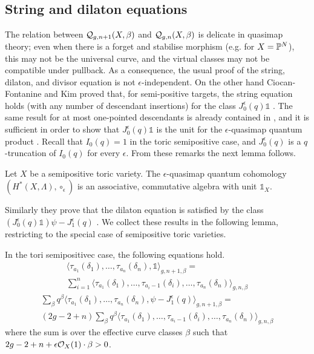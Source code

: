 \subsection{String and dilaton equations}
 The relation between $\mathcal{Q}_{g,n+1}(X,\beta)$ and $\mathcal{Q}_{g,n}(X,\beta)$ is delicate in quasimap theory; even when there is a forget and stabilise morphism (e.g. for $X=\mathbb P^N$), this may not be the universal curve, and the virtual classes may not be compatible under pullback. As a consequence, the usual proof of the string, dilaton, and divisor equation is not $\epsilon$-independent. On the other hand Ciocan-Fontanine and Kim proved that, for semi-positive targets, the string equation holds (with any number of descendant insertions) for the class $J_0^\epsilon(q)\mathds{1}$ \cite[Proposition 3.4.1]{CF-K-higher-genus}. The same result for at most one-pointed descendants is already contained in \cite[Corollary 5.5.4]{CF-K-wallcrossing}, and it is sufficient in order to show that $J_0^\epsilon(q)\mathds{1}$ is the unit for the $\epsilon$-quasimap quantum product \cite[Remark 3.1.4]{CF-K-higher-genus}. Recall that $I_0(q)=1$ in the toric semipositive case, and $J_0^\epsilon(q)$ is a $q$-truncation of $I_0(q)$ for every $\epsilon$. From these remarks the next lemma follows.

 \begin{lemma}
 Let $X$ be a semipositive toric variety. The $\epsilon$-quasimap quantum cohomology $(H^*(X,\Lambda),\circ_\epsilon)$ is an associative, commutative algebra with unit $\mathds 1_X$.
 \end{lemma}
 
 Similarly they prove that the dilaton equation is satisfied by the class $(J_0^\epsilon(q)\mathds{1})\psi-J_1^\epsilon(q)$ \cite[Lemma 3.4.3]{CF-K-higher-genus}. We collect these results in the following lemma, restricting to the special case of semipositive toric varieties.
 \begin{lemma}
  In the tori semipositivec case, the following equations hold.
  \begin{multline}\tag{string}
   \langle \tau_{a_1}(\delta_1),\ldots,\tau_{a_n}(\delta_n), \mathds{1}\rangle_{g,n+1,\beta}= \\
   \sum_{i=1}^n\langle \tau_{a_1}(\delta_1),\ldots,\tau_{a_i-1}(\delta_i),\ldots,\tau_{a_n}(\delta_n)\rangle_{g,n,\beta}
  \end{multline}
 \begin{multline}\tag{dilaton}
  \sum_{\beta}q^\beta\langle \tau_{a_1}(\delta_1),\ldots,\tau_{a_n}(\delta_n), \psi-J^\epsilon_1(q)\rangle_{g,n+1,\beta}= \\
  (2g-2+n)\sum_{\beta}q^\beta\langle \tau_{a_1}(\delta_1),\ldots,\tau_{a_i-1}(\delta_i),\ldots,\tau_{a_n}(\delta_n) \rangle_{g,n,\beta}
 \end{multline}
where the sum is over the effective curve classes $\beta$ such that $2g-2+n+\epsilon\mathcal{O}_X(1)\cdot\beta>0$.
 \end{lemma}

